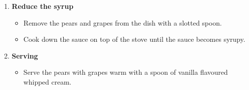 \documentclass[11pt,letterpaper]{article}
\begin{document}
\begin{description}
\begin{enumerate}
	\item {\bf Reduce the syrup}
	\begin{itemize}
	\item Remove the pears and grapes from the dish with a slotted spoon.
	\item Cook down the sauce on top of the stove until the sauce becomes syrupy.
	\end{itemize}
	\item {\bf Serving}
	\begin{itemize}
	\item Serve the pears with grapes warm with a spoon of vanilla flavoured whipped cream.
	\end{itemize}
	\end{enumerate}
\end{description}
\end{document}
